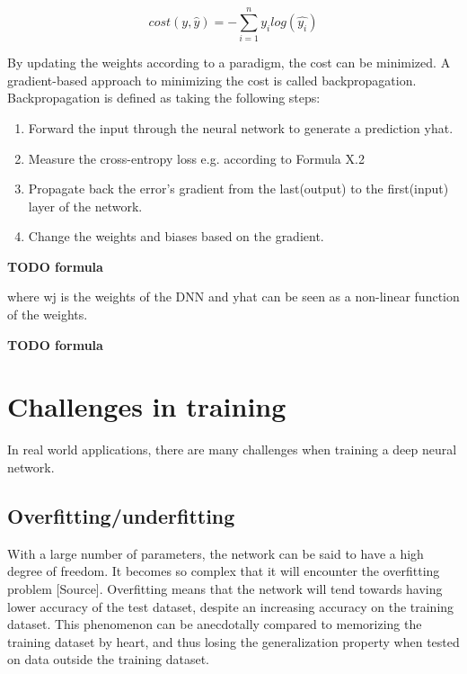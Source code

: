 \documentclass[english, bibtex]{kththesis}
\begin{document}
\begin{equation}
	cost(y, \hat{y}) = - \sum\limits_{i=1}^{n} y_i log(\hat{y_i})
  	\label{eqn:crossentropy}
\end{equation}

By updating the weights according to a paradigm, the cost can be minimized. A gradient-based approach to minimizing the cost is called backpropagation. Backpropagation is defined as taking the following steps:
\begin{enumerate}
\item Forward the input through the neural network to generate a prediction yhat.
\item Measure the cross-entropy loss e.g. according to Formula X.2
\item Propagate back the error’s gradient from the last(output) to the first(input) layer of the network.
\item Change the weights and biases based on the gradient.
\end{enumerate}

\textbf{TODO formula}

where wj is the weights of the DNN and yhat can be seen as a non-linear function of the weights.  

\textbf{TODO formula}

\section{Challenges in training}

In real world applications, there are many challenges when training a deep neural network.

\subsection{Overfitting/underfitting}

With a large number of parameters, the network can be said to have a high degree of freedom. It becomes so complex that it will encounter the overfitting problem [Source]. Overfitting means that the network will tend towards having lower accuracy of the test dataset, despite an increasing accuracy on the training dataset. This phenomenon can be anecdotally compared to memorizing the training dataset by heart, and thus losing the generalization property when tested on data outside the training dataset. 
\end{document}
